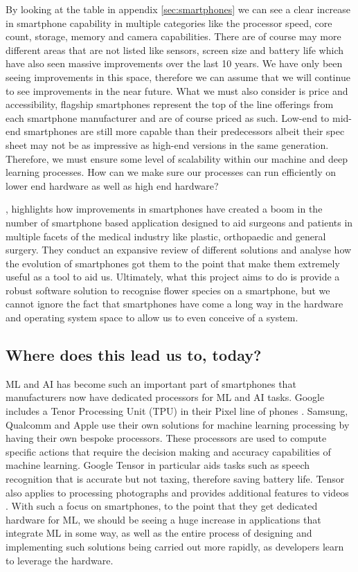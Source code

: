 \documentclass[12pt,a4paper]{report}
\begin{document}
By looking at the table in appendix \ref{sec:smartphones} we can see a clear increase in smartphone capability in 
multiple categories like the processor speed, core count, 
storage, memory and camera capabilities. There are of course may more different areas that are not listed like sensors, 
screen size and battery life which have also seen massive improvements over the last 10 years. We have only been seeing 
improvements in this space, therefore we can assume that we will continue to see improvements in the near future. 
What we must also consider is price and accessibility, flagship smartphones represent the top of the line offerings from
each smartphone manufacturer and are of course priced as such. Low-end to mid-end smartphones are still more capable 
than their predecessors albeit their spec sheet may not be as impressive as high-end versions in the same generation. 
Therefore, we must ensure some level of scalability within our machine and deep learning processes. How can we make 
sure our processes can run efficiently on lower end hardware as well as high end hardware?

\par

\citet{kulendran2014}, highlights how improvements in smartphones have created a boom in the number of 
smartphone based application designed to aid surgeons and patients in multiple facets of the medical industry like 
plastic, orthopaedic and general surgery. They conduct an expansive review of different solutions and analyse how the 
evolution of smartphones got them to the point that make them extremely useful as a tool to aid us. Ultimately, what 
this project aims to do is provide a robust software solution to recognise flower species on a smartphone, but we 
cannot ignore the fact that smartphones have come a long way in the hardware and operating system space to allow us to 
even conceive of a system.

\subsection{Where does this lead us to, today?}

ML and AI has become such an important part of smartphones that manufacturers now have dedicated processors for ML and 
AI tasks. Google includes a Tenor Processing Unit (TPU) in their Pixel line of phones \citep{triggs2021}. Samsung, 
Qualcomm and Apple use their own solutions for machine learning processing by having their own bespoke processors. These 
processors are used to compute specific actions that require the decision making and accuracy capabilities of machine 
learning. Google Tensor in particular aids tasks such as speech recognition that is accurate but not taxing, therefore 
saving battery life. Tensor also applies to processing photographs and provides additional features to videos 
\citep{gupta2021}. With such a focus on smartphones, to the point that they get dedicated hardware for ML, we should be 
seeing a huge increase in applications that integrate ML in some way, as well as the entire process of designing and 
implementing such solutions being carried out more rapidly, as developers learn to leverage the hardware.
\end{document}
